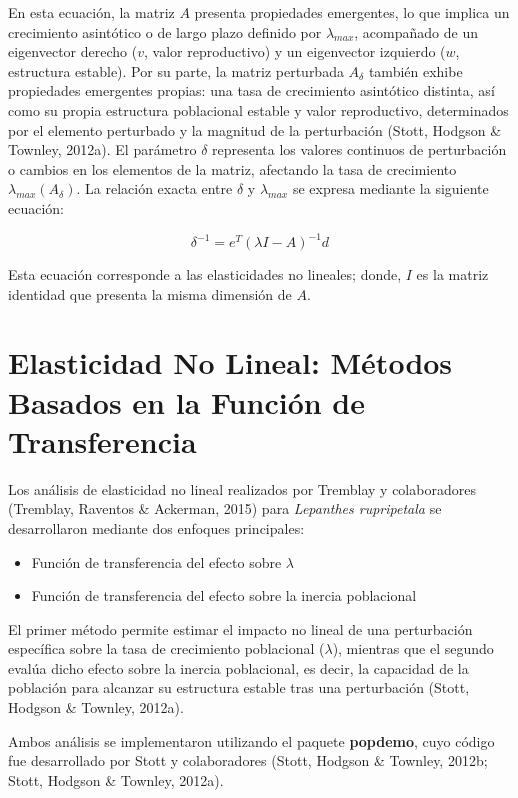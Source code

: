 \documentclass[
  12pt,
  letterpaper,
]{book}
\providecommand{\tightlist}{%
  \setlength{\itemsep}{0pt}\setlength{\parskip}{0pt}}\usepackage{longtable,booktabs,array}
\begin{document}
En esta ecuación, la matriz \(A\) presenta propiedades emergentes, lo
que implica un crecimiento asintótico o de largo plazo definido por
\(\lambda_{max}\), acompañado de un eigenvector derecho (\(v\), valor
reproductivo) y un eigenvector izquierdo (\(w\), estructura estable).
Por su parte, la matriz perturbada \(A_{\delta}\) también exhibe
propiedades emergentes propias: una tasa de crecimiento asintótico
distinta, así como su propia estructura poblacional estable y valor
reproductivo, determinados por el elemento perturbado y la magnitud de
la perturbación (Stott, Hodgson \& Townley, 2012a). El parámetro
\(\delta\) representa los valores continuos de perturbación o cambios en
los elementos de la matriz, afectando la tasa de crecimiento
\(\lambda_{max}(A_\delta)\). La relación exacta entre \(\delta\) y
\(\lambda_{max}\) se expresa mediante la siguiente ecuación:

\[\delta^{-1}=e^T\left(\lambda I-A\right)^{-1}d\]

Esta ecuación corresponde a las elasticidades no lineales; donde, \(I\)
es la matriz identidad que presenta la misma dimensión de \(A\).

\section{Elasticidad No Lineal: Métodos Basados en la Función de
Transferencia}\label{elasticidad-no-lineal-muxe9todos-basados-en-la-funciuxf3n-de-transferencia}

Los análisis de elasticidad no lineal realizados por Tremblay y
colaboradores (Tremblay, Raventos \& Ackerman, 2015) para
\emph{Lepanthes rupripetala} se desarrollaron mediante dos enfoques
principales:

\begin{itemize}
\tightlist
\item
  Función de transferencia del efecto sobre \(\lambda\)
\item
  Función de transferencia del efecto sobre la inercia poblacional
\end{itemize}

El primer método permite estimar el impacto no lineal de una
perturbación específica sobre la tasa de crecimiento poblacional
(\(\lambda\)), mientras que el segundo evalúa dicho efecto sobre la
inercia poblacional, es decir, la capacidad de la población para
alcanzar su estructura estable tras una perturbación (Stott, Hodgson \&
Townley, 2012a).

Ambos análisis se implementaron utilizando el paquete \textbf{popdemo},
cuyo código fue desarrollado por Stott y colaboradores (Stott, Hodgson
\& Townley, 2012b; Stott, Hodgson \& Townley, 2012a).
\end{document}
